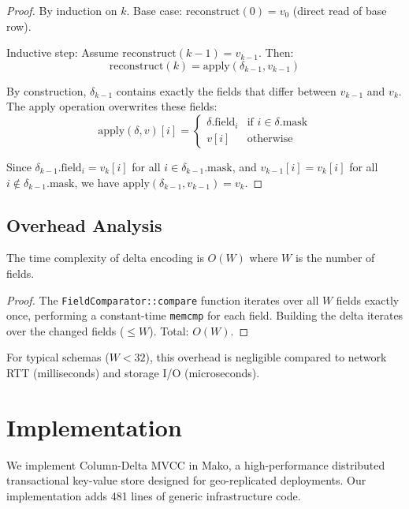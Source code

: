 \documentclass[letterpaper,twocolumn,10pt]{article}
\begin{document}
\begin{proof}
By induction on $k$. Base case: $\text{reconstruct}(0) = v_0$ (direct read of base row).

Inductive step: Assume $\text{reconstruct}(k-1) = v_{k-1}$. Then:
\[
\text{reconstruct}(k) = \text{apply}(\delta_{k-1}, v_{k-1})
\]

By construction, $\delta_{k-1}$ contains exactly the fields that differ between $v_{k-1}$ and $v_k$. The apply operation overwrites these fields:
\[
\text{apply}(\delta, v)[i] = \begin{cases}
\delta.\text{field}_i & \text{if } i \in \delta.\text{mask} \\
v[i] & \text{otherwise}
\end{cases}
\]

Since $\delta_{k-1}.\text{field}_i = v_k[i]$ for all $i \in \delta_{k-1}.\text{mask}$, and $v_{k-1}[i] = v_k[i]$ for all $i \notin \delta_{k-1}.\text{mask}$, we have $\text{apply}(\delta_{k-1}, v_{k-1}) = v_k$.
\end{proof}

\subsection{Overhead Analysis}

\begin{theorem}
The time complexity of delta encoding is $O(W)$ where $W$ is the number of fields.
\end{theorem}

\begin{proof}
The \texttt{FieldComparator::compare} function iterates over all $W$ fields exactly once, performing a constant-time \texttt{memcmp} for each field. Building the delta iterates over the changed fields ($\leq W$). Total: $O(W)$.
\end{proof}

For typical schemas ($W < 32$), this overhead is negligible compared to network RTT (milliseconds) and storage I/O (microseconds).

\section{Implementation}
\label{sec:implementation}

We implement Column-Delta MVCC in Mako, a high-performance distributed transactional key-value store designed for geo-replicated deployments. Our implementation adds 481 lines of generic infrastructure code.
\end{document}

